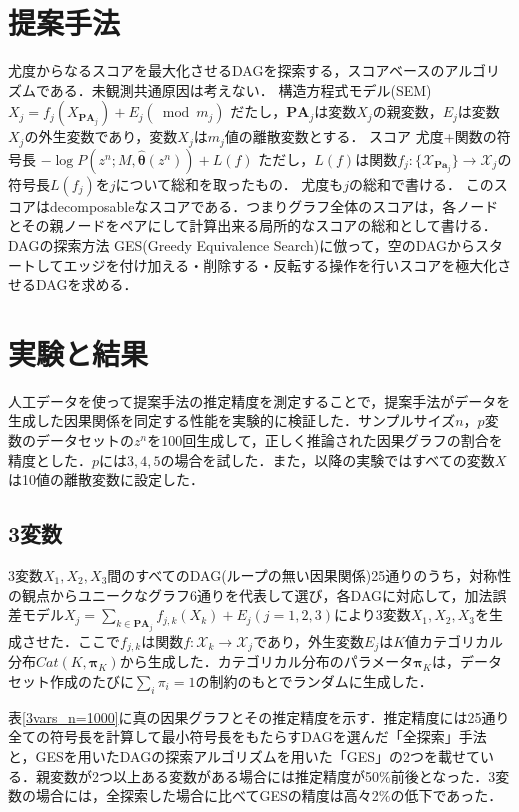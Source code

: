 \documentclass[dvipdfmx]{jsarticle}
\begin{document}
\section{提案手法}


\begin{outline}
尤度からなるスコアを最大化させるDAGを探索する，スコアベースのアルゴリズムである．未観測共通原因は考えない．
\1 構造方程式モデル(SEM)
    \2 $X_j = f_j(X_{\textbf{PA}_j}) + E_j (\bmod m_j)$
        \3 だたし，$\textbf{PA}_j$は変数$X_j$の親変数，$E_j$は変数$X_j$の外生変数であり，変数$X_j$は$m_j$値の離散変数とする．
\1 スコア
    \2 尤度+関数の符号長
    \2 $- \log P(z^n; M, \hat{\bm{\theta}}(z^n)) + L(f)$
        \3 ただし，$L(f)$は関数$f_j: \{\mathcal{X}_{\textbf{Pa}_{j}}\} \to \mathcal{X}_j$の符号長$L(f_j)$を$j$について総和を取ったもの．
        \3 尤度も$j$の総和で書ける．
        \3 このスコアはdecomposableなスコアである．つまりグラフ全体のスコアは，各ノードとその親ノードをペアにして計算出来る局所的なスコアの総和として書ける．
\1 DAGの探索方法
    \2 GES(Greedy Equivalence Search)\cite{hauser2012characterization}に倣って，空のDAGからスタートしてエッジを付け加える・削除する・反転する操作を行いスコアを極大化させるDAGを求める．
\end{outline}

\section{実験と結果}
人工データを使って提案手法の推定精度を測定することで，提案手法がデータを生成した因果関係を同定する性能を実験的に検証した．サンプルサイズ$n$，$p$変数のデータセットの$z^n$を100回生成して，正しく推論された因果グラフの割合を精度とした．$p$には$3,4,5$の場合を試した．また，以降の実験ではすべての変数$X$は10値の離散変数に設定した．
\subsection{3変数}
3変数$X_1, X_2, X_3$間のすべてのDAG(ループの無い因果関係)25通りのうち，対称性の観点からユニークなグラフ6通りを代表して選び，各DAGに対応して，加法誤差モデル$X_j = \sum_{k \in \textbf{PA}_j}f_{j, k}(X_k) + E_j (j = 1, 2, 3)$により3変数$X_1, X_2, X_3$を生成させた．ここで$f_{j, k}$は関数$f: \mathcal{X}_k \to \mathcal{X}_j$であり，外生変数$E_j$は$K$値カテゴリカル分布$Cat(K, \bm{\pi}_K)$から生成した．カテゴリカル分布のパラメータ$\bm{\pi}_K$は，データセット作成のたびに$\sum_i \pi_i = 1$の制約のもとでランダムに生成した．

表\ref{3vars_n=1000}に真の因果グラフとその推定精度を示す．推定精度には25通り全ての符号長を計算して最小符号長をもたらすDAGを選んだ「全探索」手法と，GESを用いたDAGの探索アルゴリズムを用いた「GES」の2つを載せている．親変数が2つ以上ある変数がある場合には推定精度が50\%前後となった．3変数の場合には，全探索した場合に比べてGESの精度は高々2\%の低下であった．
\end{document}
